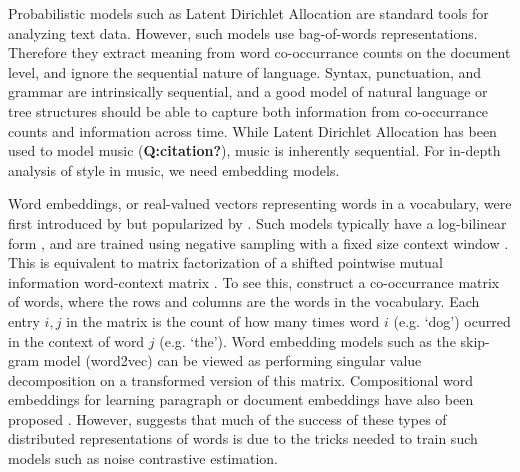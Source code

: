 

Probabilistic models such as Latent Dirichlet Allocation \cite{Blei2003} are standard tools for analyzing text data. However, such models use bag-of-words representations. Therefore they extract meaning from word co-occurrance counts on the document level, and ignore the sequential nature of language. Syntax, punctuation, and grammar are intrinsically sequential, and a good model of natural language or tree structures should be able to capture both information from co-occurrance counts and information across time. While Latent Dirichlet Allocation has been used to model music (\textbf{Q:citation?}), music is inherently sequential. For in-depth analysis of style in music, we need embedding models.

Word embeddings, or real-valued vectors representing words in a vocabulary, were first introduced by \cite{Bengio2003} but popularized by \cite{Mikolov2013a}. Such models typically have a log-bilinear form \cite{Mnih2007}, and are trained using negative sampling with a fixed size context window \cite{Mikolov2013a}. This is equivalent to matrix factorization of a shifted pointwise mutual information word-context matrix \cite{Levy}. To see this, construct a co-occurrance matrix of words, where the rows and columns are the words in the vocabulary. Each entry $i, j$ in the matrix is the count of how many times word $i$ (e.g. `dog') ocurred in the context of word $j$ (e.g. `the'). Word embedding models such as the skip-gram model (word2vec) can be viewed as performing singular value decomposition on a transformed version of this matrix.  Compositional word embeddings for learning paragraph or document embeddings have also been proposed \cite{Le2014,Dai2015}. However, \cite{Levy2015a} suggests that much of the success of these types of distributed representations of words is due to the tricks needed to train such models such as noise contrastive estimation.



